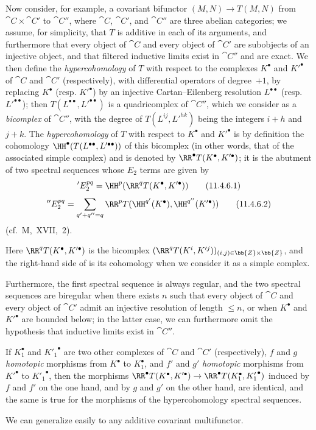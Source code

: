 \begin{env}[11.4.6]
\label{0.11.4.6}
Now consider, for example, a covariant bifunctor $(M, N) \rightarrow T(M, N)$ from $\cat{C} \times \cat{C}'$ to $\cat{C}''$, where $\cat{C}$, $\cat{C}'$, and $\cat{C}''$ are three abelian categories;
we assume, for simplicity, that $T$ is additive in each of its arguments, and furthermore that every object of $\cat{C}$ and every object of $\cat{C}'$ are subobjects of an injective object, 
and that filtered inductive limits exist in $\cat{C}''$ and are exact.
We then define the \emph{hypercohomology} of $T$ with respect to the complexes $K^\bullet$ and $K'^\bullet$ of $\cat{C}$ and $\cat{C}'$ (respectively), with differential operators of degree~$+1$, by replacing $K^\bullet$ (resp. $K'^\bullet$) by an injective Cartan--Eilenberg resolution $L^{\bullet\bullet}$ (resp. $L'^{\bullet\bullet}$);
then $T(L^{\bullet\bullet}, L'^{\bullet\bullet})$ is a quadricomplex of $\cat{C}''$, which we consider as a \emph{bicomplex} of $\cat{C}''$, with the degree of $T(L^{ij}, L'^{hk})$ being the integers $i+h$ and $j+k$.
The \emph{hypercohomology} of $T$ with respect to $K^\bullet$ and $K'^\bullet$ is by definition the cohomology $\HH^\bullet(T(L^{\bullet\bullet}, L'^{\bullet\bullet}))$ of this bicomplex  (in other words, that of the associated simple complex) and is denoted by $\RR^\bullet T(K^\bullet, K'^\bullet)$;
it is the abutment of two spectral sequences whose $E_2$ terms are given by
\[
\label{0.11.4.6.1}
  'E_2^{pq}
  = \HH^p(\RR^q T(K^\bullet, K'^\bullet))
\tag{11.4.6.1}
\]
\[
\label{0.11.4.6.2}
  ''E_2^{pq}
  = \sum_{q'+q''=q}\RR^p T(\HH^{q'}(K^\bullet),\HH^{q''}(K'^\bullet))
\tag{11.4.6.2}
\]
(cf.~M,~XVII,~2).

Here $\RR^q T(K^\bullet, K'^\bullet)$ is the bicomplex $(\RR^q T(K^i, K'^j))_{(i,j)\in \bb{Z}\times \bb{Z}}$, and the right-hand side of  is its cohomology when we consider it as a simple complex.

Furthermore, the first spectral sequence is always regular, and the two spectral sequences are biregular when there exists $n$ such that every object of $\cat{C}$ and every object of $\cat{C}'$ admit an injective resolution of length $\leq n$, or when $K^\bullet$ and $K'^\bullet$ are bounded below;
in the latter case, we can furthermore omit the hypothesis that inductive limits exist in $\cat{C}''$.

If $K_1^\bullet$ and ${K'_1}^\bullet$ are two other complexes of $\cat{C}$ and $\cat{C}'$ (respectively), $f$ and $g$ \emph{homotopic} morphisms from $K^\bullet$ to $K_1^\bullet$, 
and $f'$ and $g'$ \emph{homotopic} morphisms from $K'^\bullet$ to ${K'_1}^\bullet$, then the morphisms $\RR^\bullet  T(K^\bullet, K'^\bullet) \rightarrow \RR^\bullet  T(K_1^\bullet, {K'_1}^\bullet)$ induced by $f$ and $f'$ on the one hand, and by $g$ and $g'$ on the other hand, are identical, and the same is true for the morphisms of the hypercohomology spectral sequences.

We can generalize easily to any additive covariant multifunctor.
\end{env}

